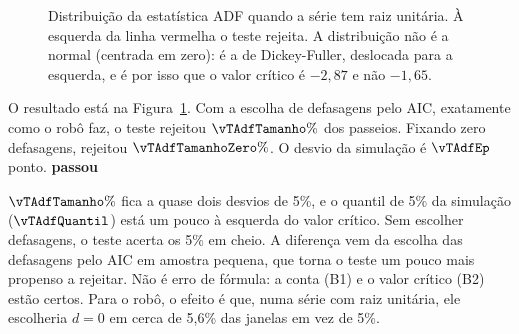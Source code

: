 \documentclass[11pt,a4paper]{article}
\newcommand{\arq}[1]{../../../dados/verificacao/testes_formulas_2026-10-30/#1}
\newcommand{\ok}{\textcolor{cok}{\textbf{passou}}}
\begin{document}
\begin{figure}[htbp]
\centering
{}
\caption{Distribuição da estatística ADF quando a série tem raiz unitária. À esquerda da linha vermelha o teste
rejeita. A distribuição não é a normal (centrada em zero): é a de Dickey-Fuller, deslocada para a esquerda, e é
por isso que o valor crítico é $-2{,}87$ e não $-1{,}65$.}
\label{fig:adfh0}
\end{figure}

O resultado está na Figura~\ref{fig:adfh0}. Com a escolha de defasagens pelo AIC, exatamente como o robô faz, o
teste rejeitou $\vTAdfTamanho\%$ dos passeios. Fixando zero defasagens, rejeitou $\vTAdfTamanhoZero\%$. O desvio
da simulação é $\vTAdfEp$ ponto. \ok

\begin{cuidado}
$\vTAdfTamanho\%$ fica a quase dois desvios de 5\%, e o quantil de 5\% da simulação ($\vTAdfQuantil$) está um
pouco à esquerda do valor crítico. Sem escolher defasagens, o teste acerta os 5\% em cheio. A diferença vem da
escolha das defasagens pelo AIC em amostra pequena, que torna o teste um pouco mais propenso a rejeitar. Não é
erro de fórmula: a conta (B1) e o valor crítico (B2) estão certos. Para o robô, o efeito é que, numa série com
raiz unitária, ele escolheria $d = 0$ em cerca de 5{,}6\% das janelas em vez de 5\%.
\end{cuidado}
\end{document}
